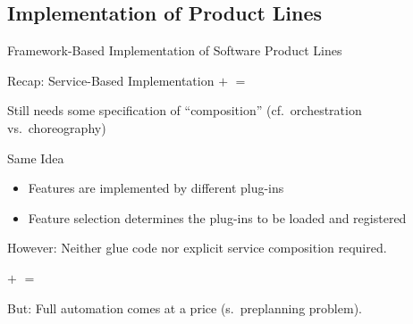 \subsection{Implementation of Product Lines}
\begin{frame}{Framework-Based Implementation of Software Product Lines}
	\begin{mycolumns}[widths={40,60},animation=none]
		\begin{example}{Recap: Service-Based Implementation}
				\vspace*{\fill}
					$+$ 
				\vspace*{\fill}	
				\vspace*{\fill}
					$=$ 
				\vspace*{\fill}	
		\end{example}
		\begin{example}{Still needs some specification of ``composition'' (cf.\ orchestration vs.\ choreography)}
			\centering
		\end{example}
	\mynextcolumn		
		\pause
		\begin{definition}{Same Idea}
			\begin{itemize}
				\item Features are implemented by different plug-ins
				\item Feature selection determines the plug-ins to be loaded and registered 
			\end{itemize}
		\end{definition}
		\pause
		\begin{note}{}
				However: Neither glue code nor explicit service composition required.
		\end{note}
		\begin{example}{}
				\vspace*{\fill}
					$+$ 
				\vspace*{\fill}	
				\vspace*{\fill}
					$=$ 
				\vspace*{\fill}	
		\end{example}
		\pause
		\begin{note}{}
				But: Full automation comes at a price (s.\ preplanning problem).
		\end{note}		
	\end{mycolumns}	
\end{frame}

